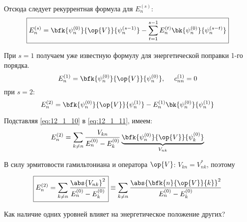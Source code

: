 Отсюда следует рекуррентная формула для $E_n^{(s)}$:
$$
\boxed{E_n^{(s)} = \bfk{\psi_n^{(0)}}{\op{V}}{\psi_n^{(s-1)}} - \sum_{t=1}^{s-1} E_n^{(t)} \bk{\psi_n^{(0)}}{\psi_n^{(s-t)}}}
$$

При $s=1$ получаем уже известную формулу для энергетической поправки 1-го порядка.
$$
E_n^{(1)} = \bfk{\psi_n^{(0)}}{\op{V}}{\psi_n^{(0)}}, ~~~~c_{nn}^{(1)} = 0
$$
при $s=2$:
\begin{equation}
\label{eq:12_1_11}
E_n^{(2)} = \bfk{\psi_n^{(0)}}{\op{V}}{\psi_n^{(1)}} - E_n^{(1)}\bk{\psi_n^{(0)}}{\psi_n^{(1)}}
\end{equation}

Подставляя \eqref{eq:12_1_10} в \eqref{eq:12_1_11}, имеем:
\begin{gather*}
E_n^{(2)} = \sum_{k \neq n} \frac{V_{kn}}{E_n^{(0)} - E_k^{(0)}} \underbrace{\bfk{\psi_n^{(0)}}{\op{V}}{\psi_k^{(0)}}}_{V_{nk}}
\end{gather*}

В силу эрмитовости гамильтониана и оператора $\op{V}$: $V_{kn} = V_{nk}^{*}$, поэтому

\begin{equation}
\label{eq:12_1_12}
\boxed{E_n^{(2)} = \sum_{k \neq n} \frac{\abs{V_{nk}}^2}{E_n^{(0)} - E_k^{(0)}}} \equiv \sum_{k \neq n} \frac{\abs{\bfk{n}{\op{V}}{k}}^2}{E_n^{(0)} - E_k^{(0)}}
\end{equation}

Как наличие одних уровней влияет на энергетическое положение других?

